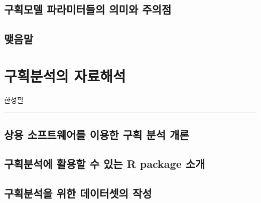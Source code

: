 \documentclass[
  11pt,
  krantz2, a4paper, twoside]{krantz}
\begin{document}
\hypertarget{uxad6cuxd68duxbaa8uxb378-uxd30cuxb77cuxbbf8uxd130uxb4e4uxc758-uxc758uxbbf8uxc640-uxc8fcuxc758uxc810}{%
\section{구획모델 파라미터들의 의미와 주의점}\label{uxad6cuxd68duxbaa8uxb378-uxd30cuxb77cuxbbf8uxd130uxb4e4uxc758-uxc758uxbbf8uxc640-uxc8fcuxc758uxc810}}

\hypertarget{uxb9fauxc74cuxb9d0-3}{%
\section{맺음말}\label{uxb9fauxc74cuxb9d0-3}}

\hypertarget{ca-analysis}{%
\chapter{구획분석의 자료해석}\label{ca-analysis}}

\Large\hfill

한성필
\normalsize

\begin{center}\rule{0.5\linewidth}{0.5pt}\end{center}

\hypertarget{uxc0c1uxc6a9-uxc18cuxd504uxd2b8uxc6e8uxc5b4uxb97c-uxc774uxc6a9uxd55c-uxad6cuxd68d-uxbd84uxc11d-uxac1cuxb860}{%
\section{상용 소프트웨어를 이용한 구획 분석 개론}\label{uxc0c1uxc6a9-uxc18cuxd504uxd2b8uxc6e8uxc5b4uxb97c-uxc774uxc6a9uxd55c-uxad6cuxd68d-uxbd84uxc11d-uxac1cuxb860}}

\hypertarget{uxad6cuxd68duxbd84uxc11duxc5d0-uxd65cuxc6a9uxd560-uxc218-uxc788uxb294-r-package-uxc18cuxac1c}{%
\section{구획분석에 활용할 수 있는 R package 소개}\label{uxad6cuxd68duxbd84uxc11duxc5d0-uxd65cuxc6a9uxd560-uxc218-uxc788uxb294-r-package-uxc18cuxac1c}}

\hypertarget{uxad6cuxd68duxbd84uxc11duxc744-uxc704uxd55c-uxb370uxc774uxd130uxc14buxc758-uxc791uxc131}{%
\section{구획분석을 위한 데이터셋의 작성}\label{uxad6cuxd68duxbd84uxc11duxc744-uxc704uxd55c-uxb370uxc774uxd130uxc14buxc758-uxc791uxc131}}
\end{document}
